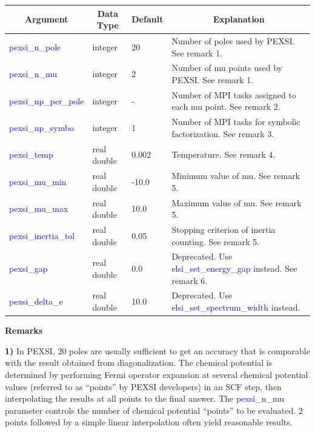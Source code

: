 \documentclass{report}
\begin{document}
\begin{tabular}[]{|p{30mm}|p{20mm}|p{15mm}|p{100mm}|}
\hline
\multicolumn{1}{|c|}{\textbf{Argument}} & \multicolumn{1}{c|}{\textbf{Data Type}} & \multicolumn{1}{c|}{\textbf{Default}} & \multicolumn{1}{c|}{\textbf{Explanation}}\\
\hline
\textcolor{blue}{pexsi\_n\_pole}       & integer     & 20    & Number of poles used by PEXSI. See remark 1.\\
\hline
\textcolor{blue}{pexsi\_n\_mu}         & integer     & 2     & Number of mu points used by PEXSI. See remark 1.\\
\hline
\textcolor{blue}{pexsi\_np\_per\_pole} & integer     & -     & Number of MPI tasks assigned to each mu point. See remark 2.\\
\hline
\textcolor{blue}{pexsi\_np\_symbo}     & integer     & 1     & Number of MPI tasks for symbolic factorization. See remark 3.\\
\hline
\textcolor{blue}{pexsi\_temp}          & real double & 0.002 & Temperature. See remark 4.\\
\hline
\textcolor{blue}{pexsi\_mu\_min}       & real double & -10.0 & Minimum value of mu. See remark 5.\\
\hline
\textcolor{blue}{pexsi\_mu\_max}       & real double & 10.0  & Maximum value of mu. See remark 5.\\
\hline
\textcolor{blue}{pexsi\_inertia\_tol}  & real double & 0.05  & Stopping criterion of inertia counting. See remark 5.\\
\hline
\textcolor{blue}{pexsi\_gap}           & real double & 0.0   & Deprecated. Use \textcolor{blue}{elsi\_set\_energy\_gap} instead. See remark 6.\\
\hline
\textcolor{blue}{pexsi\_delta\_e}      & real double & 10.0  & Deprecated. Use \textcolor{blue}{elsi\_set\_spectrum\_width} instead.\\
\hline
\end{tabular}

\textbf{Remarks}

\textbf{1)} In PEXSI, 20 poles are usually sufficient to get an accuracy that is comparable with the result obtained from diagonalization. The chemical potential is determined by performing Fermi operator expansion at several chemical potential values (referred to as ``points'' by PEXSI developers) in an SCF step, then interpolating the results at all points to the final answer. The \textcolor{blue}{pexsi\_n\_mu} parameter controls the number of chemical potential ``points'' to be evaluated. 2 points followed by a simple linear interpolation often yield reasonable results.
\end{document}
